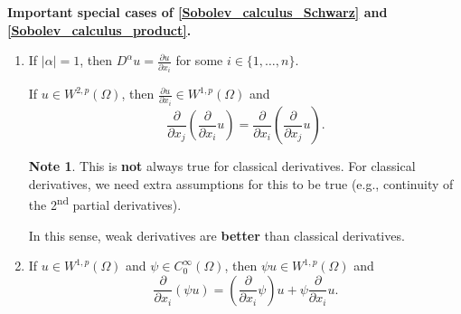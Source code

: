 \documentclass[12pt]{article}
\theoremstyle{definition}
\newtheorem*{note}{Note}
\begin{document}
\textbf{Important special cases of \ref{Sobolev_calculus_Schwarz} and \ref{Sobolev_calculus_product}.}
\begin{enumerate}[label=(\roman*)]
\item If $|\alpha|=1$, then $D^\alpha u=\frac{\partial u}{\partial x_i}$ for some $i\in\{1,\ldots,n\}$.

If $u\in W^{2,p}(\Omega)$, then $\frac{\partial u}{\partial x_i}\in W^{1,p}(\Omega)$ and
\[\frac\partial{\partial x_j}\left(\frac\partial{\partial x_i}u\right)=\frac\partial{\partial x_i}\left(\frac\partial{\partial x_j}u\right).\]

\begin{note}
This is \textbf{not} always true for classical derivatives. For classical derivatives, we need extra assumptions for this to be true (e.g., continuity of the 2\textsuperscript{nd} partial derivatives).

In this sense, weak derivatives are \textbf{better} than classical derivatives.
\end{note}

\setcounter{enumi}{3}
\item If $u\in W^{1,p}(\Omega)$ and $\psi\in C_0^\infty(\Omega)$, then $\psi u\in W^{1,p}(\Omega)$ and
\[\frac\partial{\partial x_i}(\psi u)=\left(\frac\partial{\partial x_i}\psi\right)u+\psi\frac\partial{\partial x_i}u.\]
\end{enumerate}
\end{document}
